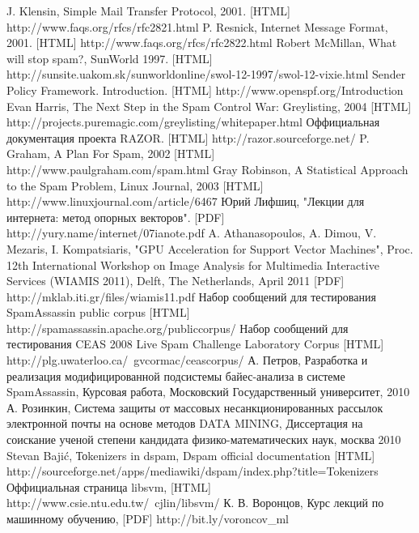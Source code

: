 \newpage
\begin{thebibliography}{99}
 J. Klensin, Simple Mail Transfer Protocol, 2001. [HTML] http://www.faqs.org/rfcs/rfc2821.html 
 P. Resnick, Internet Message Format, 2001. [HTML] http://www.faqs.org/rfcs/rfc2822.html
 Robert McMillan, What will stop spam?, SunWorld 1997. [HTML] http://sunsite.uakom.sk/sunworldonline/swol-12-1997/swol-12-vixie.html
 Sender Policy Framework. Introduction.  [HTML] http://www.openspf.org/Introduction
 Evan Harris, The Next Step in the Spam Control War: Greylisting, 2004 [HTML] http://projects.puremagic.com/greylisting/whitepaper.html
 Оффициальная документация проекта RAZOR. [HTML] http://razor.sourceforge.net/
 P. Graham, A Plan For Spam, 2002 [HTML] http://www.paulgraham.com/spam.html
 Gray Robinson, A Statistical Approach to the Spam Problem, Linux Journal, 2003 [HTML] http://www.linuxjournal.com/article/6467 
 Юрий Лифшиц, "Лекции для интернета: метод опорных векторов". [PDF] http://yury.name/internet/07ianote.pdf
A. Athanasopoulos, A. Dimou, V. Mezaris, I. Kompatsiaris, "GPU Acceleration for Support Vector Machines", Proc. 12th International Workshop on Image Analysis for Multimedia Interactive Services (WIAMIS 2011), Delft, The Netherlands, April 2011 [PDF] http://mklab.iti.gr/files/wiamis11.pdf
 Набор сообщений для тестирования SpamAssassin public corpus [HTML] http://spamassassin.apache.org/publiccorpus/
 Набор сообщений для тестирования CEAS 2008 Live Spam Challenge Laboratory Corpus [HTML] http://plg.uwaterloo.ca/~gvcormac/ceascorpus/
 А. Петров, Разработка и реализация модифицированной подсистемы байес-анализа в системе SpamAssassin, Курсовая работа, Московский Государственный университет, 2010
 А. Розинкин, Система защиты от массовых несанкционированных рассылок электронной почты на основе методов DATA MINING, Диссертация на соискание ученой степени кандидата физико-математических наук, москва 2010 
 Stevan Bajić, Тоkenizers in dspam, Dspam official documentation [HTML] http://sourceforge.net/apps/mediawiki/dspam/index.php?title=Tokenizers
Оффициальная страница libsvm, [HTML] http://www.csie.ntu.edu.tw/~cjlin/libsvm/
 К. В. Воронцов, Курс лекций по машинному обучению, [PDF] http://bit.ly/voroncov\_ml 
\end{thebibliography}

